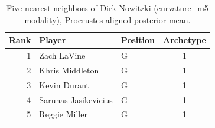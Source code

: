 \begin{table}[htbp]
  \centering\small
  \begin{tabular}{rllc}
    \toprule
    Rank & Player & Position & Archetype \\
    \midrule
    1 & Zach LaVine & G & 1 \\
    2 & Khris Middleton & G & 1 \\
    3 & Kevin Durant & G & 1 \\
    4 & Sarunas Jasikevicius & G & 1 \\
    5 & Reggie Miller & G & 1 \\
    \bottomrule
  \end{tabular}
  \caption{Five nearest neighbors of Dirk Nowitzki (curvature_m5 modality), Procrustes-aligned posterior mean.}
  \label{tab:Dirk_Nowitzki_neighbors_curvature_m5}
\end{table}

